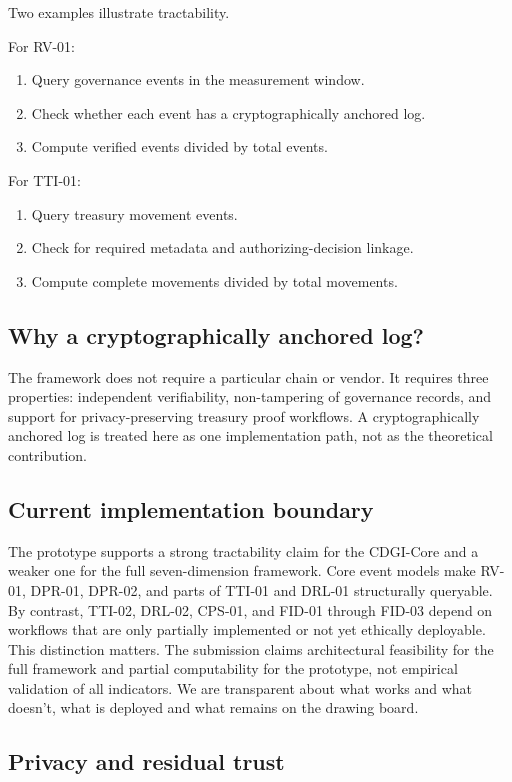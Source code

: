 \documentclass[review,onecolumn]{elsarticle}
\begin{document}
Two examples illustrate tractability.

For RV-01:
\begin{enumerate}
\item Query governance events in the measurement window.
\item Check whether each event has a cryptographically anchored log.
\item Compute verified events divided by total events.
\end{enumerate}

For TTI-01:
\begin{enumerate}
\item Query treasury movement events.
\item Check for required metadata and authorizing-decision linkage.
\item Compute complete movements divided by total movements.
\end{enumerate}

\subsection{Why a cryptographically anchored log?}

The framework does not require a particular chain or vendor. It requires three properties: independent verifiability, non-tampering of governance records, and support for privacy-preserving treasury proof workflows. A cryptographically anchored log is treated here as one implementation path, not as the theoretical contribution.

\subsection{Current implementation boundary}

The prototype supports a strong tractability claim for the CDGI-Core and a weaker one for the full seven-dimension framework. Core event models make RV-01, DPR-01, DPR-02, and parts of TTI-01 and DRL-01 structurally queryable. By contrast, TTI-02, DRL-02, CPS-01, and FID-01 through FID-03 depend on workflows that are only partially implemented or not yet ethically deployable. This distinction matters. The submission claims architectural feasibility for the full framework and partial computability for the prototype, not empirical validation of all indicators. We are transparent about what works and what doesn’t, what is deployed and what remains on the drawing board.

\subsection{Privacy and residual trust}
\end{document}

